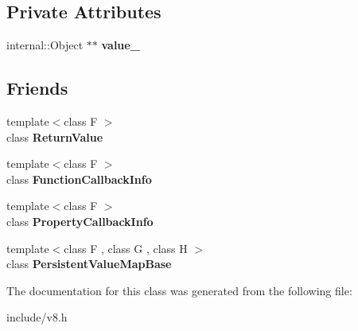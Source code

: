 \subsection*{Private Attributes}
\begin{DoxyCompactItemize}
\item 
internal\+::\+Object $\ast$$\ast$ {\bfseries value\+\_\+}\hypertarget{classv8_1_1_return_value_abb24c21d81cd11d48a5f3872529702a7}{}\label{classv8_1_1_return_value_abb24c21d81cd11d48a5f3872529702a7}

\end{DoxyCompactItemize}
\subsection*{Friends}
\begin{DoxyCompactItemize}
\item 
{\footnotesize template$<$class F $>$ }\\class {\bfseries Return\+Value}\hypertarget{classv8_1_1_return_value_a53f604d3d6f2dc0647df33c9979f116a}{}\label{classv8_1_1_return_value_a53f604d3d6f2dc0647df33c9979f116a}

\item 
{\footnotesize template$<$class F $>$ }\\class {\bfseries Function\+Callback\+Info}\hypertarget{classv8_1_1_return_value_a76786e6fa2d0eac5e2d4f647659d0d23}{}\label{classv8_1_1_return_value_a76786e6fa2d0eac5e2d4f647659d0d23}

\item 
{\footnotesize template$<$class F $>$ }\\class {\bfseries Property\+Callback\+Info}\hypertarget{classv8_1_1_return_value_a5018adab21fade2b42f4f60e45fa1083}{}\label{classv8_1_1_return_value_a5018adab21fade2b42f4f60e45fa1083}

\item 
{\footnotesize template$<$class F , class G , class H $>$ }\\class {\bfseries Persistent\+Value\+Map\+Base}\hypertarget{classv8_1_1_return_value_a08e2b8f164392d71811ce6cc134f33e3}{}\label{classv8_1_1_return_value_a08e2b8f164392d71811ce6cc134f33e3}

\end{DoxyCompactItemize}


The documentation for this class was generated from the following file\+:\begin{DoxyCompactItemize}
\item 
include/v8.\+h\end{DoxyCompactItemize}
